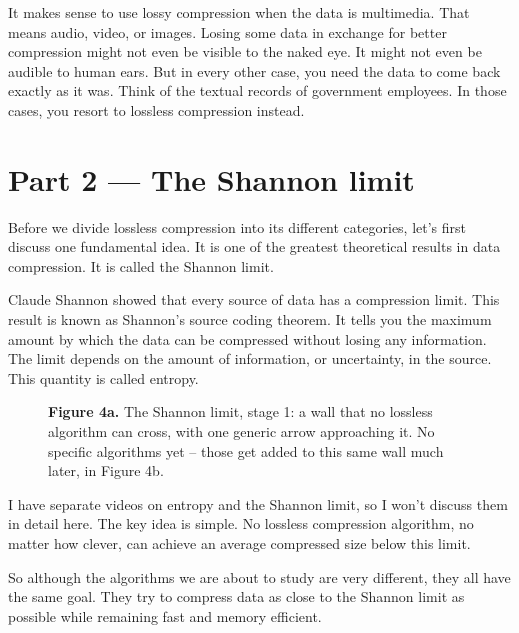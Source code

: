\documentclass[11pt]{article}
\begin{document}
It makes sense to use lossy compression when the data is multimedia. That
means audio, video, or images. Losing some data in exchange for better
compression might not even be visible to the naked eye. It might not even be
audible to human ears. But in every other case, you need the data to come
back exactly as it was. Think of the textual records of government
employees. In those cases, you resort to lossless compression instead.

\section*{Part 2 --- The Shannon limit}

Before we divide lossless compression into its different categories, let's
first discuss one fundamental idea. It is one of the greatest theoretical
results in data compression. It is called the Shannon limit.

Claude Shannon showed that every source of data has a compression limit.
This result is known as Shannon's source coding theorem. It tells you the
maximum amount by which the data can be compressed without losing any
information. The limit depends on the amount of information, or
uncertainty, in the source. This quantity is called entropy.

\begin{figure}[H]
\centering
{}
\caption*{\textbf{Figure 4a.} The Shannon limit, stage 1: a wall that no
lossless algorithm can cross, with one generic arrow approaching it. No
specific algorithms yet -- those get added to this same wall much later, in
Figure 4b.}
\end{figure}

I have separate videos on entropy and the Shannon limit, so I won't discuss
them in detail here. The key idea is simple. No lossless compression
algorithm, no matter how clever, can achieve an average compressed size
below this limit.

So although the algorithms we are about to study are very different, they
all have the same goal. They try to compress data as close to the Shannon
limit as possible while remaining fast and memory efficient.
\end{document}
